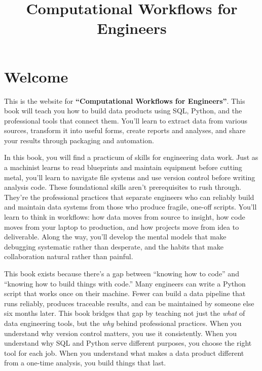 \documentclass[
  letterpaper,
  DIV=11,
  numbers=noendperiod]{scrreprt}
\title{Computational Workflows for Engineers}
\author{}
\date{}
\renewcommand*\contentsname{Table of contents}
\newcommand\contentsname{Table of contents}
\begin{document}
\maketitle

\renewcommand*\contentsname{Table of contents}
{
\hypersetup{linkcolor=}
\setcounter{tocdepth}{2}
\tableofcontents
}


\chapter*{Welcome}\label{welcome}


This is the website for \textbf{``Computational Workflows for
Engineers''}. This book will teach you how to build data products using
SQL, Python, and the professional tools that connect them. You'll learn
to extract data from various sources, transform it into useful forms,
create reports and analyses, and share your results through packaging
and automation.

In this book, you will find a practicum of skills for engineering data
work. Just as a machinist learns to read blueprints and maintain
equipment before cutting metal, you'll learn to navigate file systems
and use version control before writing analysis code. These foundational
skills aren't prerequisites to rush through. They're the professional
practices that separate engineers who can reliably build and maintain
data systems from those who produce fragile, one-off scripts. You'll
learn to think in workflows: how data moves from source to insight, how
code moves from your laptop to production, and how projects move from
idea to deliverable. Along the way, you'll develop the mental models
that make debugging systematic rather than desperate, and the habits
that make collaboration natural rather than painful.

This book exists because there's a gap between ``knowing how to code''
and ``knowing how to build things with code.'' Many engineers can write
a Python script that works once on their machine. Fewer can build a data
pipeline that runs reliably, produces traceable results, and can be
maintained by someone else six months later. This book bridges that gap
by teaching not just the \emph{what} of data engineering tools, but the
\emph{why} behind professional practices. When you understand why
version control matters, you use it consistently. When you understand
why SQL and Python serve different purposes, you choose the right tool
for each job. When you understand what makes a data product different
from a one-time analysis, you build things that last.
\end{document}
